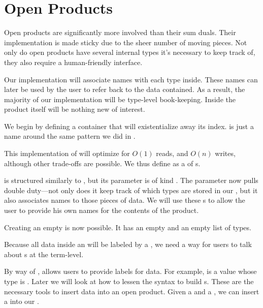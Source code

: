 \documentclass[book.tex]{subfiles}
\begin{document}
\section{Open Products}


Open products are significantly more involved than their sum duals. Their
implementation is made sticky due to the sheer number of moving pieces. Not only
do open products have several internal types it's necessary to keep track of,
they also require a human-friendly interface.

Our implementation will associate names with each type inside. These names can
later be used by the user to refer back to the data contained. As a result, the
majority of our implementation will be type-level book-keeping. Inside the
product itself will be nothing new of interest.

We begin by defining a container  that will existentialize away its
 index.  is just a name around the same pattern we did in
.


This implementation of  will optimize for $O(1)$ reads, and
$O(n)$ writes, although other trade-offs are possible. We thus define
 as a  of s.


 is structured similarly to , but its 
parameter is of kind \kind{[(Symbol, k)]}. The parameter  now pulls
double duty---not only does it keep track of which types are stored in our
, but it also associates names to those pieces of data. We will
use these s to allow the user to provide his own names for the
contents of the product.

Creating an empty  is now possible. It has an empty 
and an empty list of types.


Because all data inside an  will be labeled by a ,
we need a way for users to talk about s at the term-level.


By way of ,  allows users to provide labels
for data. For example,  is a value whose type is . Later  we will look at how to
lessen the syntax to build s. These are the necessary tools to insert
data into an open product. Given a  and a , we can insert a
 into our .
\end{document}
